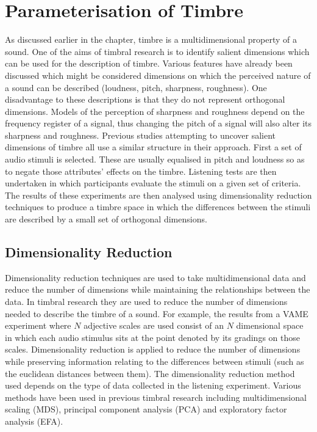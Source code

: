 \section{Parameterisation of Timbre}
\label{sec:Timbre-Parameterisation}
	As discussed earlier in the chapter, timbre is a multidimensional property of a sound. One of the aims of timbral
	research is to identify salient dimensions which can be used for the description of timbre. Various features have
	already been discussed which might be considered dimensions on which the perceived nature of a sound can be
	described (loudness, pitch, sharpness, roughness). One disadvantage to these descriptions is that they do not
	represent orthogonal dimensions. Models of the perception of sharpness and roughness depend on the frequency
	register of a signal, thus changing the pitch of a signal will also alter its sharpness and roughness. Previous
	studies attempting to uncover salient dimensions of timbre all use a similar structure in their approach.  First a
	set of audio stimuli is selected. These are usually equalised in pitch and loudness so as to negate those
	attributes' effects on the timbre. Listening tests are then undertaken in which participants evaluate the stimuli
	on a given set of criteria. The results of these experiments are then analysed using dimensionality reduction
	techniques to produce a timbre space in which the differences between the stimuli are described by a small set of
	orthogonal dimensions.

	\subsection{Dimensionality Reduction}
	\label{sec:Timbre-Parameterisation-DimensionalityReduction}
		Dimensionality reduction techniques are used to take multidimensional data and reduce the number of
		dimensions while maintaining the relationships between the data. In timbral research they are used to
		reduce the number of dimensions needed to describe the timbre of a sound. For example, the results from a
		VAME experiment where $N$ adjective scales are used consist of an $N$ dimensional space in which each audio
		stimulus sits at the point denoted by its gradings on those scales. Dimensionality reduction is applied to
		reduce the number of dimensions while preserving information relating to the differences between stimuli
		(such as the euclidean distances between them). The dimensionality reduction method used depends on the
		type of data collected in the listening experiment. Various methods have been used in previous timbral
		research including multidimensional scaling (MDS), principal component analysis (PCA) and exploratory
		factor analysis (EFA).

